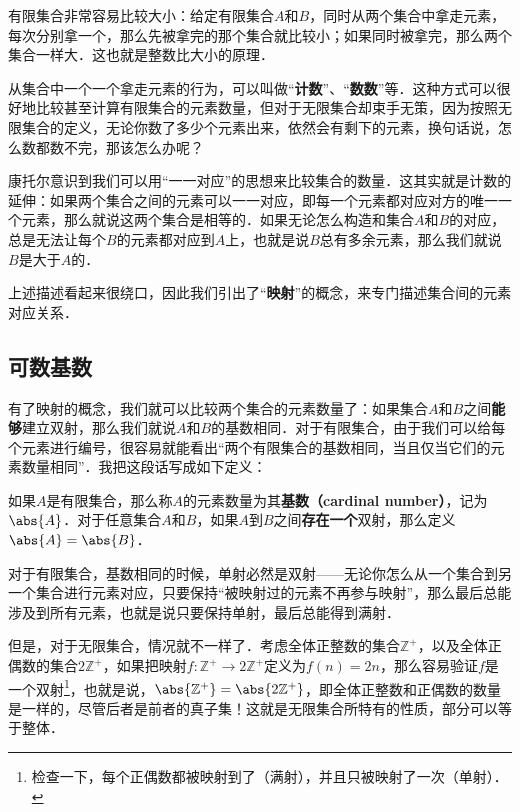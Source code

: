 有限集合非常容易比较大小：给定有限集合$A$和$B$，同时从两个集合中拿走元素，每次分别拿一个，那么先被拿完的那个集合就比较小；如果同时被拿完，那么两个集合一样大．这也就是整数比大小的原理．

从集合中一个一个拿走元素的行为，可以叫做“\textbf{计数}”、“\textbf{数数}”等．这种方式可以很好地比较甚至计算有限集合的元素数量，但对于无限集合却束手无策，因为按照无限集合的定义，无论你数了多少个元素出来，依然会有剩下的元素，换句话说，怎么数都数不完，那该怎么办呢？

康托尔意识到我们可以用“一一对应”的思想来比较集合的数量．这其实就是计数的延伸：如果两个集合之间的元素可以一一对应，即每一个元素都对应对方的唯一一个元素，那么就说这两个集合是相等的．如果无论怎么构造和集合$A$和$B$的对应，总是无法让每个$B$的元素都对应到$A$上，也就是说$B$总有多余元素，那么我们就说$B$是大于$A$的．

上述描述看起来很绕口，因此我们引出了“\textbf{映射}”的概念，来专门描述集合间的元素对应关系．



\subsection{可数基数}


有了映射的概念，我们就可以比较两个集合的元素数量了：如果集合$A$和$B$之间\textbf{能够}建立双射，那么我们就说$A$和$B$的基数相同．对于有限集合，由于我们可以给每个元素进行编号，很容易就能看出“两个有限集合的基数相同，当且仅当它们的元素数量相同”．我把这段话写成如下定义：

\begin{definition}{}
如果$A$是有限集合，那么称$A$的元素数量为其\textbf{基数（cardinal number）}，记为$\abs{A}$．对于任意集合$A$和$B$，如果$A$到$B$之间\textbf{存在一个}双射，那么定义$\abs{A}=\abs{B}$．
\end{definition}


对于有限集合，基数相同的时候，单射必然是双射——无论你怎么从一个集合到另一个集合进行元素对应，只要保持“被映射过的元素不再参与映射”，那么最后总能涉及到所有元素，也就是说只要保持单射，最后总能得到满射．

但是，对于无限集合，情况就不一样了．考虑全体正整数的集合$\mathbb{Z}^+$，以及全体正偶数的集合$2\mathbb{Z}^+$，如果把映射$f:\mathbb{Z}^+\rightarrow2\mathbb{Z}^+$定义为$f(n)=2n$，那么容易验证$f$是一个双射\footnote{检查一下，每个正偶数都被映射到了（满射），并且只被映射了一次（单射）．}，也就是说，$\abs{\mathbb{Z}^+}=\abs{2\mathbb{Z}^+}$，即全体正整数和正偶数的数量是一样的，尽管后者是前者的真子集！这就是无限集合所特有的性质，部分可以等于整体．

